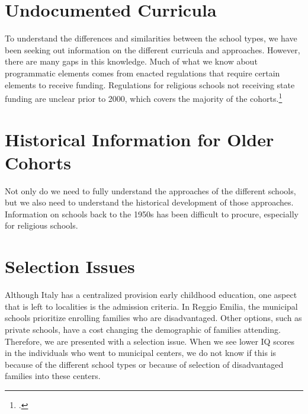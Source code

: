 \documentclass[12pt]{article}
\begin{document}
\section*{Undocumented Curricula}
To understand the differences and similarities between the school types, we have been seeking out information on the different curricula and approaches. However, there are many gaps in this knowledge. Much of what we know about programmatic elements comes from enacted regulations that require certain elements to receive funding. Regulations for religious schools not receiving state funding are unclear prior to 2000, which covers the majority of the cohorts.\footnote{\citet{ribolzi2013italy}.}

\section*{Historical Information for Older Cohorts}
Not only do we need to fully understand the approaches of the different schools, but we also need to understand the historical development of those approaches. Information on schools back to the 1950s has been difficult to procure, especially for religious schools. 

\section*{Selection Issues}
Although Italy has a centralized provision early childhood education, one aspect that is left to localities is the admission criteria. In Reggio Emilia, the municipal schools prioritize enrolling families who are disadvantaged. Other options, such as private schools, have a cost changing the demographic of families attending. Therefore, we are presented with a selection issue. When we see lower IQ scores in the individuals who went to municipal centers, we do not know if this is because of the different school types or because of selection of disadvantaged families into these centers.



\end{document}
